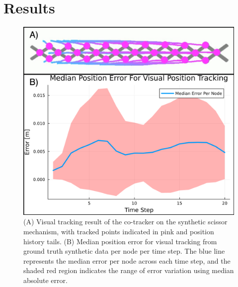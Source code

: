\section{Results} \label{results}
\begin{figure}
    \centering
    \includegraphics[width=\linewidth]{Figures/tracking_error.drawio.png}
    \caption{ (A) Visual tracking result of the co-tracker on the synthetic scissor mechanism, with tracked points indicated in pink and position history tails. (B) Median position error for visual tracking from ground truth synthetic data per node per time step. The blue line represents the median error per node across each time step, and the shaded red region indicates the range of error variation using median absolute error.}
    \label{fig:sim_to_sim-tracking}
    
\end{figure}
